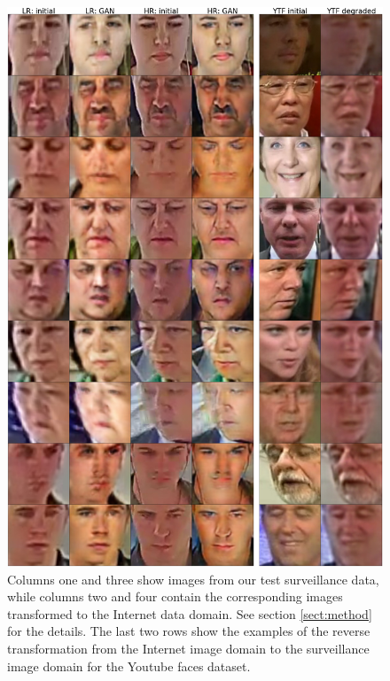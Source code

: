   
%
    \begin{figure}
    \includegraphics[width=\linewidth]{Chapters/face/Fig2.jpg}
    \caption{Columns one and three show images from our test surveillance data, while columns two and four contain the corresponding images transformed to the Internet data domain. See section \ref{sect:method} for the details. The last two rows show the examples of the reverse transformation from the Internet image domain to the surveillance image domain for the Youtube faces dataset.  }\label{fig:lr_hr_gan_res_ytube_initial_degraded}
  \end{figure}
  
  



 


